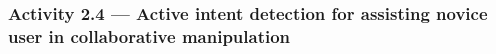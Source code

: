 \documentclass[letterpaper, 11 pt, onecolumn]{article}
\newcommand{\zhi}[1]{\textcolor{blue}{ZL: #1}}
\newcommand{\jie}[1]{\textcolor{green}{JF: #1}}
\begin{document}




\subsubsection{Activity 2.4 --- Active intent detection for assisting novice user in collaborative manipulation}\label{sec:plan-intent-ActiveIntent}
\end{document}
